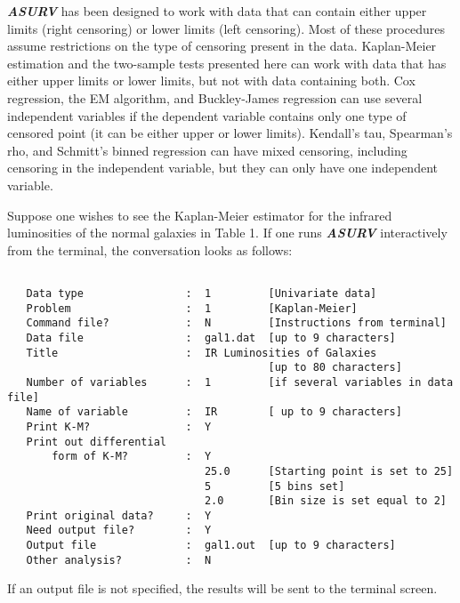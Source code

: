      {\sl\bf ASURV} has been designed to work with data that can 
contain either upper limits (right censoring) or lower limits (left 
censoring).  Most of these procedures assume restrictions on the 
type of censoring present in the data.  Kaplan-Meier estimation and 
the two-sample tests presented here can work with data that has either 
upper limits or lower limits, but not with data containing both.  Cox 
regression, the EM algorithm, and Buckley-James regression can use 
several independent variables if the dependent variable 
contains only one type of censored point (it can be either upper or lower 
limits).  Kendall's tau, Spearman's rho, and Schmitt's binned regression can 
have mixed censoring, including censoring in the independent variable, but 
they can only have one independent variable.

\bigskip
\bigskip
{}
 
     Suppose one wishes to see the Kaplan-Meier estimator for the infrared
luminosities of the normal galaxies in Table 1. If one runs {\sl\bf ASURV}
interactively from the terminal, the conversation looks as follows:

\begin{verbatim}

   Data type                :  1         [Univariate data]
   Problem                  :  1         [Kaplan-Meier]
   Command file?            :  N         [Instructions from terminal]
   Data file                :  gal1.dat  [up to 9 characters]
   Title                    :  IR Luminosities of Galaxies
                                         [up to 80 characters]
   Number of variables      :  1         [if several variables in data file] 
   Name of variable         :  IR        [ up to 9 characters]
   Print K-M?               :  Y
   Print out differential
       form of K-M?         :  Y
                               25.0      [Starting point is set to 25]
                               5         [5 bins set]
                               2.0       [Bin size is set equal to 2]
   Print original data?     :  Y
   Need output file?        :  Y
   Output file              :  gal1.out  [up to 9 characters]
   Other analysis?          :  N

\end{verbatim}
If an output file is not specified, the results will be sent to the 
terminal screen.
 
